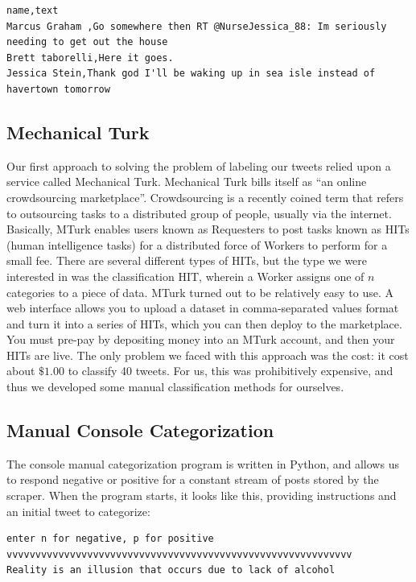 \documentclass[12pt,a4paper]{article}
\begin{document}
\begin{verbatim}
name,text
Marcus Graham ,Go somewhere then RT @NurseJessica_88: Im seriously needing to get out the house
Brett taborelli,Here it goes.
Jessica Stein,Thank god I'll be waking up in sea isle instead of havertown tomorrow
\end{verbatim}

\subsection { Mechanical Turk }

Our first approach to solving the problem of labeling our tweets relied upon a service called Mechanical Turk. Mechanical Turk bills itself as ``an online crowdsourcing marketplace''. Crowdsourcing is a recently coined term that refers to outsourcing tasks to a distributed group of people, usually via the internet. Basically, MTurk enables users known as Requesters to post tasks known as HITs (human intelligence tasks) for a distributed force of Workers to perform for a small fee. There are several different types of HITs, but the type we were interested in was the classification HIT, wherein a Worker assigns one of $n$ categories to a piece of data. MTurk turned out to be relatively easy to use. A web interface allows you to upload a dataset in comma-separated values format and turn it into a series of HITs, which you can then deploy to the marketplace. You must pre-pay by depositing money into an MTurk account, and then your HITs are live. The only problem we faced with this approach was the cost: it cost about $\$1.00$ to classify 40 tweets. For us, this was prohibitively expensive, and thus we developed some manual classification methods for ourselves.

\subsection { Manual Console Categorization }

The console manual categorization program is written in Python, and allows us to respond negative or positive for a constant stream of posts stored by the scraper.  When the program starts, it looks like this, providing instructions and an initial tweet to categorize:

\begin{verbatim}
enter n for negative, p for positive
vvvvvvvvvvvvvvvvvvvvvvvvvvvvvvvvvvvvvvvvvvvvvvvvvvvvvvvvvvvv
Reality is an illusion that occurs due to lack of alcohol
\end{verbatim}
\end{document}
